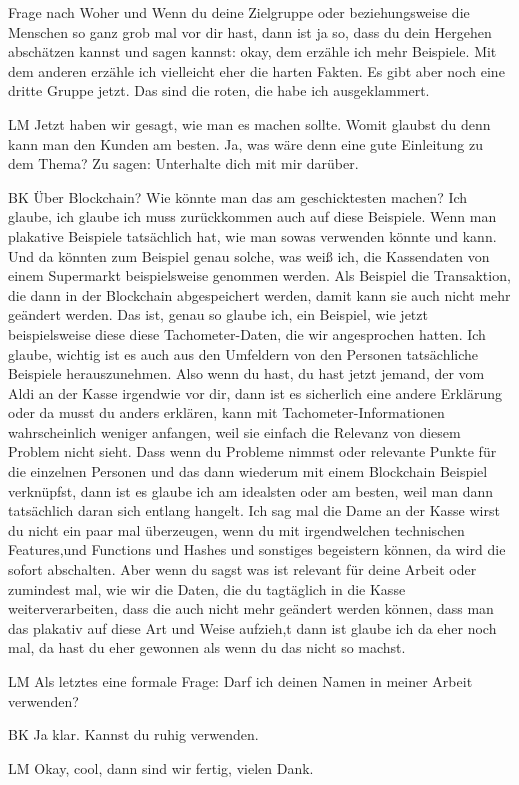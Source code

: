\begin{xlist}
Frage nach Woher und Wenn du deine Zielgruppe oder beziehungsweise die Menschen so ganz grob mal vor dir hast, dann ist ja so, dass du dein Hergehen abschätzen kannst und sagen kannst: okay, dem erzähle ich mehr Beispiele. Mit dem anderen erzähle ich vielleicht eher die harten Fakten. Es gibt aber noch eine dritte Gruppe jetzt. Das sind die roten, die habe ich ausgeklammert.
    \item[LM] Jetzt haben wir gesagt, wie man es machen sollte. Womit glaubst du denn kann man den Kunden am besten. Ja, was wäre denn eine gute Einleitung zu dem Thema? Zu sagen: Unterhalte dich mit mir darüber.
    \item[BK] Über Blockchain? Wie könnte man das am geschicktesten machen? Ich glaube, ich glaube ich muss zurückkommen auch auf diese Beispiele. Wenn man plakative Beispiele tatsächlich hat, wie man sowas verwenden könnte und kann. Und da könnten zum Beispiel genau solche, was weiß ich, die Kassendaten von einem Supermarkt beispielsweise genommen werden. Als Beispiel die Transaktion, die dann in der Blockchain abgespeichert werden, damit kann sie auch nicht mehr geändert werden. Das ist, genau so glaube ich, ein Beispiel, wie jetzt beispielsweise diese diese Tachometer-Daten, die wir angesprochen hatten. Ich glaube, wichtig ist es auch aus den Umfeldern von den Personen tatsächliche Beispiele herauszunehmen. Also wenn du hast, du hast jetzt jemand, der vom Aldi an der Kasse irgendwie vor dir, dann ist es sicherlich eine andere Erklärung oder da musst du anders erklären, kann mit Tachometer-Informationen wahrscheinlich weniger anfangen, weil sie einfach die Relevanz von diesem Problem nicht sieht. Dass wenn du Probleme nimmst oder relevante Punkte für die einzelnen Personen und das dann wiederum mit einem Blockchain Beispiel verknüpfst, dann ist es glaube ich am idealsten oder am besten, weil man dann tatsächlich daran sich entlang hangelt. Ich sag mal die Dame an der Kasse wirst du nicht ein paar mal überzeugen, wenn du mit irgendwelchen technischen Features,und Functions und Hashes und sonstiges begeistern können, da wird die sofort abschalten. Aber wenn du sagst was ist relevant für deine Arbeit oder zumindest mal, wie wir die Daten, die du tagtäglich in die Kasse weiterverarbeiten, dass die auch nicht mehr geändert werden können, dass man das plakativ auf diese Art und Weise aufzieh,t dann ist glaube ich da eher noch mal, da hast du eher gewonnen als wenn du das nicht so machst. 
\item[LM] Als letztes eine formale Frage: Darf ich deinen Namen in meiner Arbeit verwenden?
\item[BK] Ja klar. Kannst du ruhig verwenden. 
\item[LM] Okay, cool, dann sind wir fertig, vielen Dank. 

\end{xlist}

